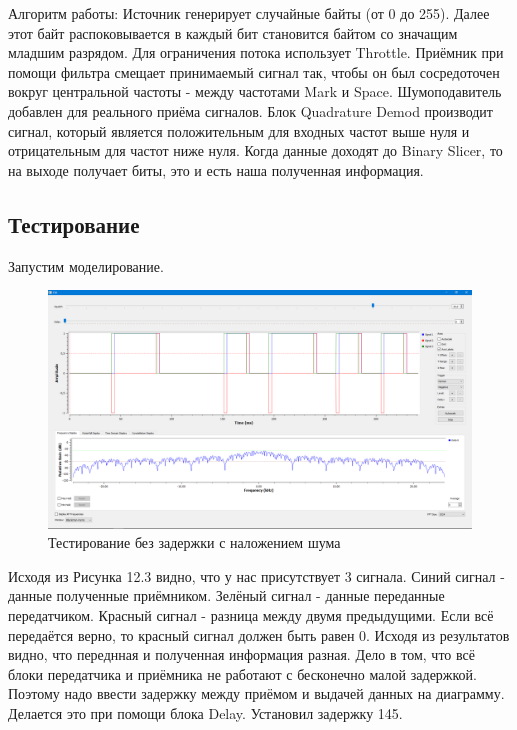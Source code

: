 Алгоритм работы:
\quad Источник генерирует случайные байты (от 0 до 255). Далее этот байт распоковывается в каждый бит становится байтом со значащим младшим разрядом. Для ограничения потока использует Throttle.
\quad Приёмник при помощи фильтра смещает принимаемый сигнал так, чтобы он был сосредоточен вокруг центральной частоты - между частотами Mark и Space. Шумоподавитель добавлен для реального приёма сигналов. Блок Quadrature Demod производит сигнал, который является положительным для входных частот выше нуля и отрицательным для частот ниже нуля. Когда данные доходят до Binary Slicer, то на выходе получает биты, это и есть наша полученная информация.

\subsection{Тестирование}
Запустим моделирование.

    \begin{figure}[H]
	\begin{center}
		\includegraphics[scale=0.27]{fig/lab12/lab12_03.png}
		\caption{Тестирование без задержки с наложением шума}
		\label{pic:e1} %
	\end{center}
\end{figure}

Исходя из Рисунка 12.3 видно, что у нас присутствует 3 сигнала. Синий сигнал - данные полученные приёмником. Зелёный сигнал - данные переданные передатчиком. Красный сигнал - разница между двумя предыдущими. Если всё передаётся верно, то красный сигнал должен быть равен 0. Исходя из результатов видно, что переднная и полученная информация разная. Дело в том, что всё блоки передатчика и приёмника не работают с бесконечно малой задержкой. Поэтому надо ввести задержку между приёмом и выдачей данных на диаграмму. Делается это при помощи блока Delay. Установил задержку 145.

